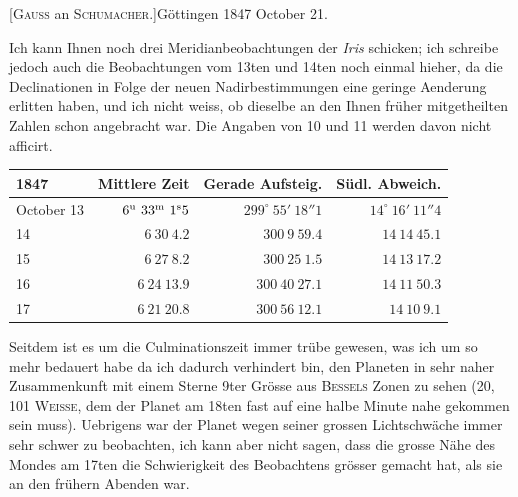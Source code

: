 \par{}\bigskip
\hypertarget{native-480-october21}{}
\begin{center}[\textsc{Gauss} an \textsc{Schumacher}.]\quad Göttingen 1847 October 21.\end{center}

Ich kann Ihnen noch drei Meridianbeobachtungen der \emph{Iris} schicken; ich schreibe jedoch auch die Beobachtungen vom 13ten und 14ten noch einmal hieher, da die Declinationen in Folge der neuen Nadirbestimmungen eine geringe Aenderung erlitten haben, und ich nicht weiss, ob dieselbe an den Ihnen früher mitgetheilten Zahlen schon angebracht war. Die Angaben von 10 und 11 werden davon nicht afficirt.

\begin{center}
\setlength{\tabcolsep}{4pt}
\begin{tabular}{l|r|r|r}
1847 & Mittlere Zeit & Gerade Aufsteig. & Südl. Abweich. \\\hline
October 13 & $6^{\rm u}\ 33^{\rm m}\ 1^{\rm s}5$ & $299^\circ\ 55'\ 18''1$ & $14^\circ\ 16'\ 11''4$ \\
\hfill 14 & $6\ 30\ 4.2$ & $300\ 9\ 59.4$ & $14\ 14\ 45.1$ \\
\hfill 15 & $6\ 27\ 8.2$ & $300\ 25\ 1.5$ & $14\ 13\ 17.2$ \\
\hfill 16 & $6\ 24\ 13.9$ & $300\ 40\ 27.1$ & $14\ 11\ 50.3$ \\
\hfill 17 & $6\ 21\ 20.8$ & $300\ 56\ 12.1$ & $14\ 10\ 9.1$ \\
\end{tabular}
\end{center}

Seitdem ist es um die Culminationszeit immer trübe gewesen, was ich um so mehr bedauert habe da ich dadurch verhindert bin, den Planeten in sehr naher Zusammenkunft mit einem Sterne 9ter Grösse aus \textsc{Bessels} Zonen zu sehen (20, 101 \textsc{Weisse}, dem der Planet am 18ten fast auf eine halbe Minute nahe gekommen sein muss). Uebrigens war der Planet wegen seiner grossen Lichtschwäche immer sehr schwer zu beobachten, ich kann aber nicht sagen, dass die grosse Nähe des Mondes am 17ten die Schwierigkeit des Beobachtens grösser gemacht hat, als sie an den frühern Abenden war.
